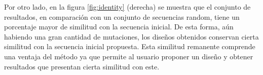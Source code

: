 Por otro lado, en la figura \ref{fig:identity} (derecha) se muestra que el conjunto de resultados, en comparación con un conjunto de secuencias random, tiene un porcentaje mayor de similitud con la secuencia inicial. 
De esta forma, aún habiendo una gran cantidad de mutaciones, los diseños obtenidos conservan cierta similitud con la secuencia inicial propuesta. 
Esta similitud remanente comprende una ventaja del método ya que permite al usuario proponer un diseño y obtener resultados que presentan cierta similitud con este.



